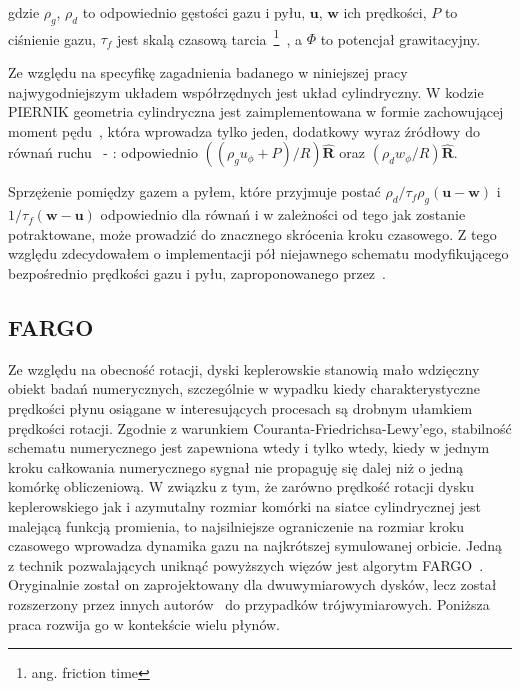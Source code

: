 \noindent gdzie $\rho_g$, $\rho_d$ to odpowiednio gęstości gazu i pyłu,
$\mathbf{u}$, $\mathbf{w}$ ich prędkości, $P$ to ciśnienie gazu, $\tau_f$ jest
skalą czasową tarcia~\footnote{ang. friction time}~, a $\Phi$ to
potencjał grawitacyjny.

\par Ze względu na specyfikę zagadnienia badanego w niniejszej pracy
najwygodniejszym układem współrzędnych jest układ cylindryczny. W kodzie
PIERNIK geometria cylindryczna jest zaimplementowana w formie zachowującej
moment pędu~\cite{M07,SO10}, która wprowadza tylko jeden, dodatkowy wyraz
źródłowy do równań ruchu~ - : odpowiednio
$\left((\rho_g u_\phi + P) / R\right)\mathbf{\hat{R}}$ oraz $(\rho_d w_\phi / R)
\mathbf{\hat{R}}$.
\par Sprzężenie pomiędzy gazem a pyłem, które przyjmuje postać
$\rho_d/\tau_f\rho_g(\mathbf{u}-\mathbf{w})$ i
$1/\tau_f(\mathbf{w}-\mathbf{u})$ odpowiednio dla równań  i 
 w zależności od tego jak zostanie potraktowane, może prowadzić do
 znacznego skrócenia kroku czasowego. Z tego względu zdecydowałem o
 implementacji pół niejawnego schematu modyfikującego bezpośrednio prędkości gazu
 i pyłu, zaproponowanego przez~\cite{TB09}.

%
%
\subsection{FARGO}
Ze względu na obecność rotacji, dyski keplerowskie stanowią mało wdzięczny
obiekt badań numerycznych, szczególnie w wypadku kiedy charakterystyczne
prędkości płynu osiągane w interesujących procesach są drobnym ułamkiem
prędkości rotacji. Zgodnie z warunkiem Couranta-Friedrichsa-Lewy'ego, stabilność
schematu numerycznego jest zapewniona wtedy i tylko wtedy, kiedy w jednym kroku
całkowania numerycznego sygnał nie propaguję się dalej niż o jedną komórkę
obliczeniową. W związku z tym, że zarówno prędkość rotacji dysku keplerowskiego
jak i azymutalny rozmiar komórki na siatce cylindrycznej jest malejącą funkcją
promienia, to najsilniejsze ograniczenie na rozmiar kroku czasowego wprowadza
dynamika gazu na najkrótszej symulowanej orbicie. Jedną z technik pozwalających
uniknąć powyższych więzów jest algorytm FARGO~\citep{Masset00}. Oryginalnie
został on zaprojektowany dla dwuwymiarowych dysków, lecz został rozszerzony
przez innych autorów~\cite{fargo2} do przypadków trójwymiarowych. Poniższa praca
rozwija go w kontekście wielu płynów.

